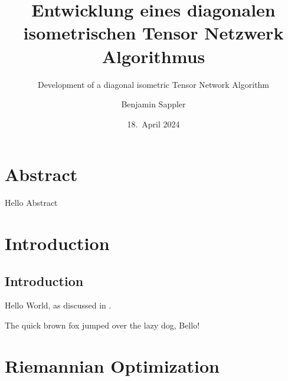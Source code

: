 \documentclass[encoding=utf8,british]{template/thesis}
\title{Entwicklung eines diagonalen isometrischen Tensor Netzwerk Algorithmus}
\subtitle{Development of a diagonal isometric Tensor Network Algorithm}
\author{Benjamin Sappler}
\date{18.~April 2024}
\begin{document}
	\frontmatter
	\maketitle
	\tableofcontents
	
	\chapter{Abstract}
	
	Hello Abstract
	
	\mainmatter
	
	\chapter{Introduction}
	
	\section{Introduction}
	
	Hello World, as discussed in \cite{helloworld}.
	
	\newpage
	
	The quick brown fox jumped over the lazy dog, \eg Bello!
	
	\appendix
	\chapter{Riemannian Optimization}
	
	\backmatter
	\printbibliography
	
\end{document}
